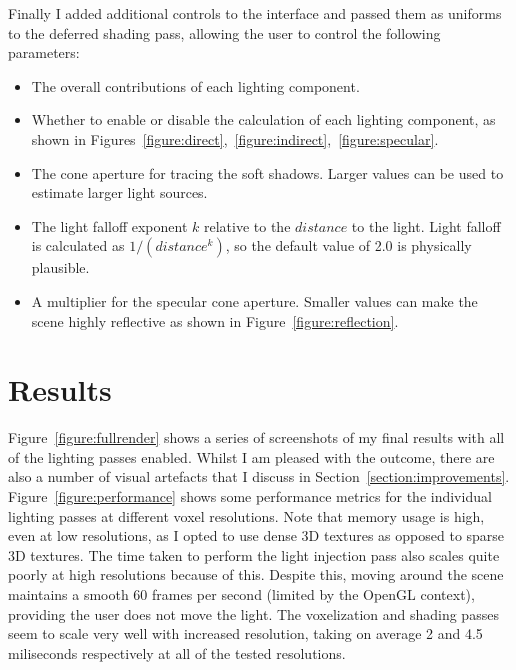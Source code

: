 \documentclass[]{acmsiggraph}
\begin{document}
Finally I added additional controls to the interface and passed them as uniforms to the deferred shading pass, allowing the user to control the following parameters:
\begin{itemize}
	\item The overall contributions of each lighting component.
	\item Whether to enable or disable the calculation of each lighting component, as shown in Figures~\ref{figure:direct},~\ref{figure:indirect},~\ref{figure:specular}.
	\item The cone aperture for tracing the soft shadows. Larger values can be used to estimate larger light sources.
	\item The light falloff exponent $k$ relative to the $distance$ to the light. Light falloff is calculated as $1 / (distance^k)$, so the default value of 2.0 is physically plausible.
	\item A multiplier for the specular cone aperture. Smaller values can make the scene highly reflective as shown in Figure~\ref{figure:reflection}.
\end{itemize}

\section{Results}

Figure~\ref{figure:fullrender} shows a series of screenshots of my final results with all of the lighting passes enabled. Whilst I am pleased with the outcome, there are also a number of visual artefacts that I discuss in Section~\ref{section:improvements}. Figure~\ref{figure:performance} shows some performance metrics for the individual lighting passes at different voxel resolutions. Note that memory usage is high, even at low resolutions, as I opted to use dense 3D textures as opposed to sparse 3D textures. The time taken to perform the light injection pass also scales quite poorly at high resolutions because of this. Despite this, moving around the scene maintains a smooth 60 frames per second (limited by the OpenGL context), providing the user does not move the light. The voxelization and shading passes seem to scale very well with increased resolution, taking on average 2 and 4.5 miliseconds respectively at all of the tested resolutions.
\end{document}
